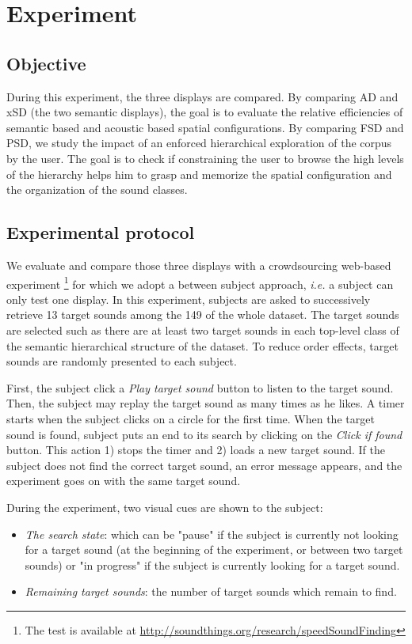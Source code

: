 \documentclass{aes2e}
\begin{document}
\section{Experiment} \label{test}

\subsection{Objective}

During this experiment, the three displays are compared. By comparing AD and xSD (the two semantic displays), the goal is to evaluate the  relative efficiencies of semantic based and acoustic based spatial configurations. By comparing FSD and PSD, we study the impact of an enforced hierarchical exploration of the corpus by the user. The goal is to check if constraining the user to browse the high levels of the hierarchy helps him to grasp and memorize the spatial configuration and the organization of the sound classes. 

\subsection{Experimental protocol}

We evaluate and compare those three displays with a crowdsourcing web-based experiment \footnote{The test is available at \url{http://soundthings.org/research/speedSoundFinding}} for which we adopt a between subject approach, \textit{i.e.} a subject can only test one display. In this experiment, subjects are asked to successively retrieve 13 target sounds among the 149 of the whole dataset. The target sounds are selected such as there are at least two target sounds in each top-level class of the semantic hierarchical structure of the dataset. To reduce order effects, target sounds are randomly presented to each subject.

First, the subject click a \textit{Play target sound} button to listen to the target sound. Then, the subject may replay the target sound  as many times as he likes. A timer starts when the subject clicks on a circle for the first time. When the target sound is found, subject puts an end to its search by clicking on the \textit{Click if found} button. This action 1) stops the timer and 2) loads a new target sound. If the subject does not find the correct target sound, an error message appears, and the experiment goes on with the same target sound.

During the experiment, two visual cues are shown to the subject:
\begin{itemize}
\item \textit{The search state}: which can be "pause" if the subject is currently not looking for a target sound (at the beginning of the experiment, or between two target sounds) or  "in progress"  if the subject is currently looking for a target sound.
\item \textit{Remaining target sounds}: the number of target sounds which remain to find.
\end{itemize}
\end{document}
